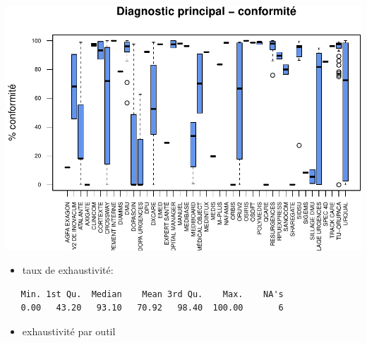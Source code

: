 \documentclass[]{article}
\begin{document}
\includegraphics{septembre2015_files/figure-latex/unnamed-chunk-19-1.pdf}

\begin{itemize}
\itemsep1pt\parskip0pt
\item
  taux de exhaustivité:
\end{itemize}

\begin{verbatim}
   Min. 1st Qu.  Median    Mean 3rd Qu.    Max.    NA's 
   0.00   43.20   93.10   70.92   98.40  100.00       6 
\end{verbatim}

\begin{itemize}
\itemsep1pt\parskip0pt
\item
  exhaustivité par outil
\end{itemize}
\end{document}
